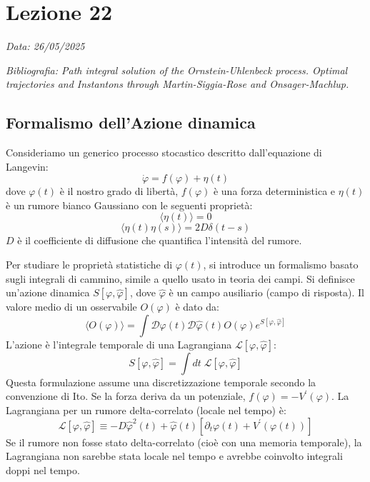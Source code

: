 \chapter{Lezione 22}
\label{chap:lezione_22} %

\begin{flushright}
\textit{Data: 26/05/2025}
\end{flushright}
\textit{Bibliografia: 
Path integral solution of the Ornstein-Uhlenbeck process. Optimal trajectories and Instantons through Martin-Siggia-Rose and Onsager-Machlup.}

\section{Formalismo dell'Azione dinamica}

Consideriamo un generico processo stocastico descritto dall'equazione di Langevin:
\begin{equation}
\dot{\varphi}=f(\varphi)+\eta(t)
\end{equation}
dove $\varphi(t)$ è il nostro grado di libertà, $f(\varphi)$ è una forza deterministica e $\eta(t)$ è un rumore bianco Gaussiano con le seguenti proprietà:
\begin{equation}
\langle\eta(t)\rangle=0
\end{equation}
\begin{equation}
\langle\eta(t)\eta(s)\rangle=2D\delta(t-s)
\end{equation}
$D$ è il coefficiente di diffusione che quantifica l'intensità del rumore.

Per studiare le proprietà statistiche di $\varphi(t)$, si introduce un formalismo basato sugli integrali di cammino, simile a quello usato in teoria dei campi.
Si definisce un'azione dinamica $S[\varphi,\hat{\varphi}]$, dove $\hat{\varphi}$ è un campo ausiliario (campo di risposta).
Il valore medio di un osservabile $O(\varphi)$ è dato da:
\begin{equation}
\langle O(\varphi)\rangle =\int \mathcal{D}\varphi(t)\mathcal{D}\hat{\varphi}(t) O(\varphi) e^{S[\varphi,\hat{\varphi}]}
\end{equation}
L'azione è l'integrale temporale di una Lagrangiana $\mathcal{L}[\varphi,\hat{\varphi}]$:
\begin{equation}
S[\varphi,\hat{\varphi}]=\int dt \; \mathcal{L}[\varphi,\hat{\varphi}]
\end{equation}
Questa formulazione assume una discretizzazione temporale secondo la convenzione di Ito.
Se la forza deriva da un potenziale, $f(\varphi)=-V^{\prime}(\varphi)$.
La Lagrangiana per un rumore delta-correlato (locale nel tempo) è:
\begin{equation}
\mathcal{L}[\varphi,\hat{\varphi}]\equiv-D\hat{\varphi}^{2}(t)+\hat{\varphi}(t)[\partial_{t}\varphi(t)+V^{\prime}(\varphi(t))]
\end{equation}
Se il rumore non fosse stato delta-correlato (cioè con una memoria temporale), la Lagrangiana non sarebbe stata locale nel tempo e avrebbe coinvolto integrali doppi nel tempo.

